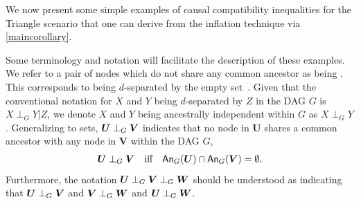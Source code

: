 



We now present some simple examples of causal compatibility inequalities for the Triangle scenario that one can derive from the inflation technique via \cref{maincorollary}.

Some terminology and notation will facilitate the description of these examples. We refer to a pair of nodes which do not share any common ancestor as being . This corresponds to being $d$-separated by the empty set~\cite{pearl2009causality,spirtes2011causation,studeny2005probabilistic,koller2009probabilistic}.  Given that the conventional notation for $X$ and $Y$ being $d$-separated by $Z$ in the DAG $G$ is $X\perp_G Y|Z$, we denote $X$ and $Y$ being ancestrally independent within $G$ as $X\perp_G Y$.  Generalizing to sets, $\bm{U}\aindep_G \bm{V}$ indicates that no node in $\bm{U}$ shares a common ancestor with any node in $\bm{V}$ within the DAG $G$, 
\begin{align}
\bm{U}\aindep_G \bm{V} \quad \text{iff} \quad \An[G]{\bm{U}}\cap\An[G]{\bm{V}}=\emptyset.
\end{align}
Furthermore, the notation ${\bm{U}\aindep_G \bm{V}\aindep_G \bm{W}}$ should be understood as indicating that $\bm{U}\aindep_G \bm{V}$ and $\bm{V}\aindep_G \bm{W}$ and $\bm{U}\aindep_G \bm{W}$.

